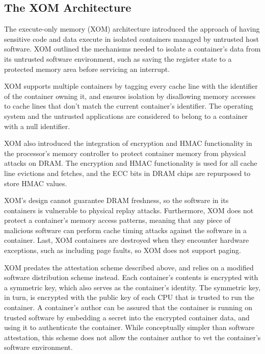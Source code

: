 \subsection{The XOM Architecture}

The execute-only memory (XOM) architecture \cite{lie2000xom} introduced the
approach of having sensitive code and data execute in isolated containers
managed by untrusted host software. XOM outlined the mechanisms needed to
isolate a container's data from its untrusted software environment, such as
saving the register state to a protected memory area before servicing an
interrupt.

XOM supports multiple containers by tagging every cache line with the
identifier of the container owning it, and ensures isolation by disallowing
memory accesses to cache lines that don't match the current container's
identifier. The operating system and the untrusted applications are considered
to belong to a container with a null identifier.

XOM also introduced the integration of encryption and HMAC functionality in
the processor's memory controller to protect container memory from physical
attacks on DRAM. The encryption and HMAC functionality is used for all cache
line evictions and fetches, and the ECC bits in DRAM chips are repurposed to
store HMAC values.

XOM's design cannot guarantee DRAM freshness, so the software in its containers
is vulnerable to physical replay attacks. Furthermore, XOM does not protect a
container's memory access patterns, meaning that any piece of malicious
software can perform cache timing attacks against the software in a container.
Last, XOM containers are destroyed when they encounter hardware exceptions,
such as including page faults, so XOM does not support paging.

XOM predates the attestation scheme described above, and relies on a modified
software distribution scheme instead. Each container's contents is encrypted
with a symmetric key, which also serves as the container's identity. The
symmetric key, in turn, is encrypted with the public key of each CPU that is
trusted to run the container. A container's author can be assured that the
container is running on trusted software by embedding a secret into the
encrypted container data, and using it to authenticate the container. While
conceptually simpler than software attestation, this scheme does not allow the
container author to vet the container's software environment.
